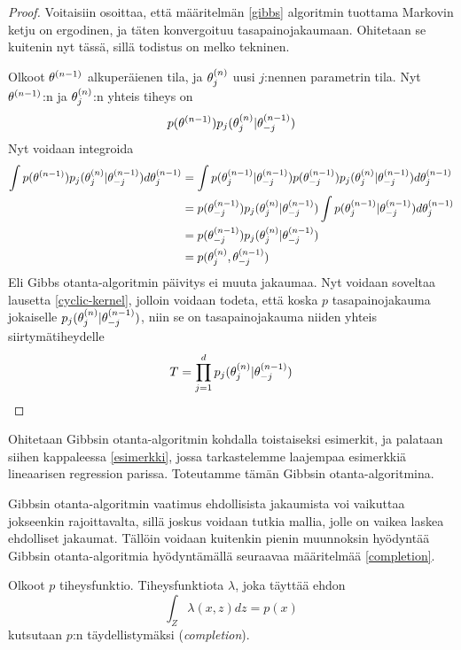 \begin{proof}
	Voitaisiin osoittaa, että määritelmän \ref{gibbs} algoritmin tuottama Markovin ketju on ergodinen, ja täten konvergoituu tasapainojakaumaan. Ohitetaan se kuitenin nyt tässä, sillä todistus on melko tekninen.
	
	Olkoot $\theta^{(n-1)}$ alkuperäienen tila, ja $\theta^{(n)}_j$ uusi $j$:nennen parametrin tila. Nyt $\theta^{(n-1)}$:n ja $\theta^{(n)}_j$:n yhteis tiheys on 
	\begin{equation}
		p(\theta^{(n-1)})p_j(\theta^{(n)}_j|\theta^{(n-1)}_{-j})
	\end{equation}
	Nyt voidaan integroida
	\begin{equation}
		\begin{split}
			\int p(\theta^{(n-1)})p_j(\theta^{(n)}_j|\theta^{(n-1)}_{-j}) d\theta^{(n-1)}_j &= \int p(\theta^{(n-1)}_j|\theta^{(n-1)}_{-j})p(\theta^{(n-1)}_{-j})p_j(\theta^{(n)}_j|\theta^{(n-1)}_{-j}) d\theta^{(n-1)}_j \\
			&= p(\theta^{(n-1)}_{-j})p_j(\theta^{(n)}_j|\theta^{(n-1)}_{-j}) \int p(\theta^{(n-1)}_j|\theta^{(n-1)}_{-j}) d\theta^{(n-1)}_j \\
			&= p(\theta^{(n-1)}_{-j})p_j(\theta^{(n)}_j|\theta^{(n-1)}_{-j}) \\
			&= p(\theta^{(n)}_j,\theta^{(n-1)}_{-j})
		\end{split}
	\end{equation}
	Eli Gibbs otanta-algoritmin päivitys ei muuta jakaumaa. Nyt voidaan soveltaa lausetta \ref{cyclic-kernel}, jolloin voidaan todeta, että koska $p$ tasapainojakauma jokaiselle $p_j(\theta^{(n)}_j|\theta^{(n-1)}_{-j})$, niin se on tasapainojakauma niiden yhteis siirtymätiheydelle
	\begin{equation}
		T = \prod_{j=1}^{d} p_j(\theta^{(n)}_j|\theta^{(n-1)}_{-j})
	\end{equation}

\end{proof}

Ohitetaan Gibbsin otanta-algoritmin kohdalla toistaiseksi esimerkit, ja palataan siihen kappaleessa \ref{esimerkki}, jossa tarkastelemme laajempaa esimerkkiä lineaarisen regression parissa. Toteutamme tämän Gibbsin otanta-algoritmina.

Gibbsin otanta-algoritmin vaatimus ehdollisista jakaumista voi vaikuttaa jokseenkin rajoittavalta, sillä joskus voidaan tutkia mallia, jolle on vaikea laskea ehdolliset jakaumat. Tällöin voidaan kuitenkin pienin muunnoksin hyödyntää Gibbsin otanta-algoritmia hyödyntämällä seuraavaa määritelmää \ref{completion}.

\begin{maar}\label{completion}
	Olkoot $p$ tiheysfunktio. Tiheysfunktiota $\lambda$, joka täyttää ehdon
	\begin{equation}
		\int_Z \lambda(x,z) dz = p(x)
	\end{equation}
	kutsutaan $p$:n täydellistymäksi (\textit{completion}).
\end{maar}

